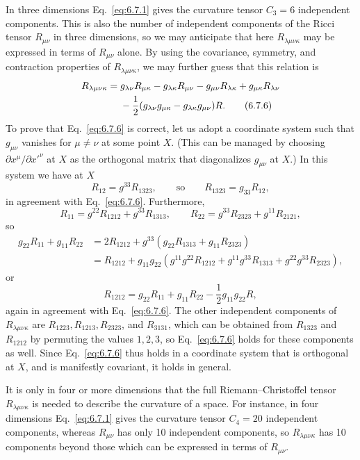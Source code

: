 In three dimensions Eq.~\eqref{eq:6.7.1} gives the curvature tensor
\(C_3=6\) independent components. This is also the number of independent
components of the Ricci tensor \(R_{\mu\nu}\) in three dimensions, so we may
anticipate that here \(R_{\lambda\mu\nu\kappa}\) may be expressed in terms of
\(R_{\mu\nu}\) alone. By using the covariance, symmetry, and contraction
properties of \(R_{\lambda\mu\nu\kappa}\), we may further guess that this
relation is
\begin{align}
  R_{\lambda\mu\nu\kappa}
  ={}&
  g_{\lambda\nu}R_{\mu\kappa}
  -g_{\lambda\kappa}R_{\mu\nu}
  -g_{\mu\nu}R_{\lambda\kappa}
  +g_{\mu\kappa}R_{\lambda\nu}
  \notag\\
  &-\frac12
  (g_{\lambda\nu}g_{\mu\kappa}
   -g_{\lambda\kappa}g_{\mu\nu})R.
  \tag{6.7.6}\label{eq:6.7.6}
\end{align}
To prove that Eq.~\eqref{eq:6.7.6} is correct, let us adopt a coordinate
system such that \(g_{\mu\nu}\) vanishes for \(\mu\ne\nu\) at some point
\(X\). (This can be managed by choosing
\(\partial x^\mu/\partial x'^\nu\) at \(X\) as the orthogonal matrix that
diagonalizes \(g_{\mu\nu}\) at \(X\).) In this system we have at \(X\)
\[
  R_{12}=g^{33}R_{1323},
  \qquad\text{so}\qquad
  R_{1323}=g_{33}R_{12},
\]
in agreement with Eq.~\eqref{eq:6.7.6}. Furthermore,
\[
  R_{11}=g^{22}R_{1212}+g^{33}R_{1313},
  \qquad
  R_{22}=g^{33}R_{2323}+g^{11}R_{2121},
\]
so
\begin{align*}
  g_{22}R_{11}+g_{11}R_{22}
  &=
  2R_{1212}
  +g^{33}(g_{22}R_{1313}+g_{11}R_{2323})
  \\
  &=
  R_{1212}
  +g_{11}g_{22}
   \left(
     g^{11}g^{22}R_{1212}
     +g^{11}g^{33}R_{1313}
     +g^{22}g^{33}R_{2323}
   \right),
\end{align*}
or
\[
  R_{1212}
  =
  g_{22}R_{11}
  +g_{11}R_{22}
  -\frac12g_{11}g_{22}R,
\]
again in agreement with Eq.~\eqref{eq:6.7.6}. The other independent
components of \(R_{\lambda\mu\nu\kappa}\) are
\(R_{1223},R_{1213},R_{2323}\), and \(R_{3131}\), which can be obtained from
\(R_{1323}\) and \(R_{1212}\) by permuting the values \(1,2,3\), so
Eq.~\eqref{eq:6.7.6} holds for these components as well. Since
Eq.~\eqref{eq:6.7.6} thus holds in a coordinate system that is orthogonal at
\(X\), and is manifestly covariant, it holds in general.

It is only in four or more dimensions that the full Riemann--Christoffel
tensor \(R_{\lambda\mu\nu\kappa}\) is needed to describe the curvature of a
space. For instance, in four dimensions Eq.~\eqref{eq:6.7.1} gives the
curvature tensor \(C_4=20\) independent components, whereas \(R_{\mu\nu}\)
has only 10 independent components, so \(R_{\lambda\mu\nu\kappa}\) has 10
components beyond those which can be expressed in terms of \(R_{\mu\nu}\).

